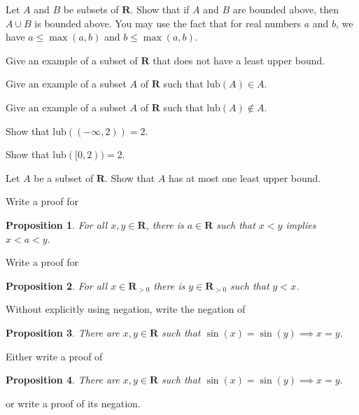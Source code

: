 \documentclass[12pt,fleqn]{exam}
\newtheorem{prop}{Proposition}
\newcommand{\reals}{\mathbf{R}}
\newcommand{\lub}{\mathrm{lub}}
\newcommand{\quiz}{Review for Exam I}
\newcommand{\term}{Fall}
\begin{document}
\large
\noindent{\textbf \quiz}


\begin{questions} 

\question Let $A$ and $B$ be subsets of $\reals$. Show that if $A$ and $B$ are bounded above,
then $A \cup B$ is bounded above.  You may use the fact that for real numbers $a$ and $b$, we have
$a \leq \max(a,b)$ and $b \leq \max(a,b)$.

\question Give an example of a subset of $\reals$ that does not have a least upper bound.

\question Give an example of a subset $A$ of $\reals$ such that $\lub(A) \in A$.

\question Give an example of a subset $A$ of $\reals$ such that $\lub(A) \notin A$.

\question Show that $\lub((-\infty, 2)) = 2$.


\question Show that $\lub([0, 2)) = 2$.

\question Let $A$ be a subset of $\reals$. Show that $A$ has at most one least upper bound.


\question Write a proof for

\begin{prop}
  For all $x,y \in \reals$, there is $a \in \reals$ such that
    $x < y$ implies $x<a<y$. \label{p1}   
\end{prop}

\question Write a proof for
    \begin{prop}   For all $x \in \reals_{>0}$ there is 
      $y \in \reals_{> 0}$ such that $y < x$.  \label{p5}
    \end{prop}
    
    
\question Without explicitly using negation, write the negation of 
        \begin{prop} There are $x,y \in \reals$ such that  $\sin(x) = \sin(y) \implies x = y$. 
     \end{prop} 
     
\question Either write a proof of 
     \begin{prop} There are $x,y \in \reals$ such that  $\sin(x) = \sin(y) \implies x = y$. 
     \end{prop} 
or write a proof of its negation.


\end{questions}
\end{document}
